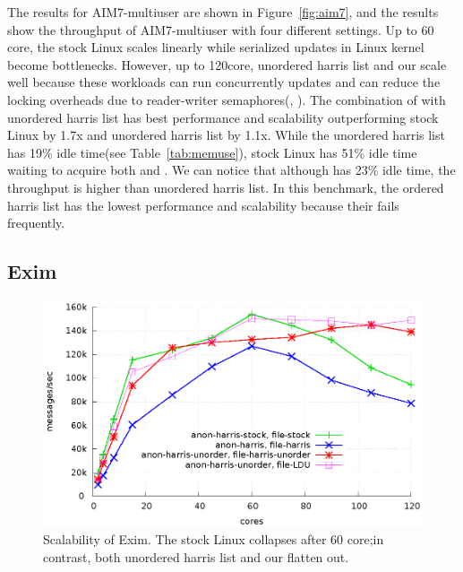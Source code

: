 The results for AIM7-multiuser are shown in Figure~\ref{fig:aim7}, and the
results show the throughput of AIM7-multiuser with four different settings.
Up to 60 core, the stock Linux scales linearly while serialized updates in
Linux kernel become bottlenecks. 
However, up to 120core, unordered harris list and our  scale well because
these workloads can run concurrently updates and can reduce the locking
overheads due to reader-writer semaphores(,
).
The combination of  with unordered harris list has best performance and
scalability outperforming stock Linux by 1.7x and unordered harris list by
1.1x.
While the unordered harris list has 19\% idle time(see
Table~\ref{tab:memuse}), stock Linux has 51\% idle time waiting to acquire
both  and .
We can notice that although  has 23\% idle time, the throughput is higher than
unordered harris list.
In this benchmark, the ordered harris list has the lowest performance and
scalability because their  fails frequently.

\subsection{Exim}

\begin{figure}[tb]
  \begin{center}
    \includegraphics[scale=0.65]{graph/exim.eps}
  \end{center}
  \caption{Scalability of Exim. The stock Linux collapses after 60 core;in
  contrast, both unordered harris list and our  flatten out.}
  \label{fig:exim}
\end{figure}


